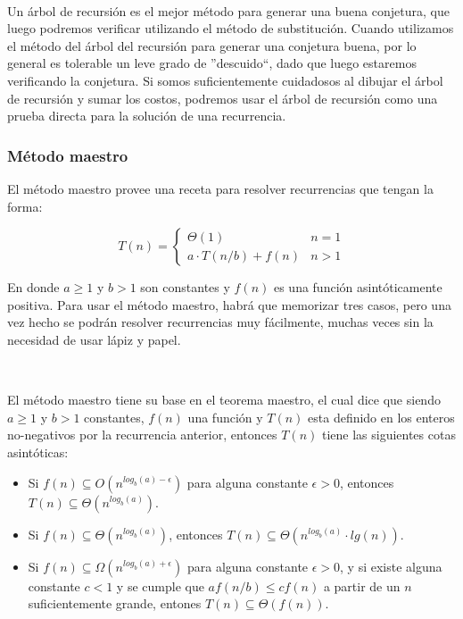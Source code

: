 ~

Un \'arbol de recursi\'on es el mejor m\'etodo para generar una buena conjetura, que luego podremos verificar utilizando el m\'etodo de substituci\'on. Cuando utilizamos el m\'etodo del \'arbol del recursi\'on para generar una conjetura buena, por lo general es tolerable un leve grado de ''descuido``, dado que luego estaremos verificando la conjetura. Si somos suficientemente cuidadosos al dibujar el \'arbol de recursi\'on y sumar los costos, podremos usar el \'arbol de recursi\'on como una prueba directa para la soluci\'on de una recurrencia.

\subsubsection{M\'etodo maestro}

El m\'etodo maestro provee una receta para resolver recurrencias que tengan la forma:

\begin{equation*}
  T(n) = \begin{cases}
	      \Theta(1)         		& n=1 \\
	      a \cdot T(n/b) + f(n)        	& n > 1
	  \end{cases}
\end{equation*}

En donde $a \geq 1$ y $b>1$ son constantes y $f(n)$ es una funci\'on asint\'oticamente positiva. Para usar el m\'etodo maestro, habr\'a que memorizar tres casos, pero una vez hecho se podr\'an resolver recurrencias muy f\'acilmente, muchas veces sin la necesidad de usar l\'apiz y papel.

~

El m\'etodo maestro tiene su base en el teorema maestro, el cual dice que siendo $a\geq 1$ y $b>1$ constantes, $f(n)$ una funci\'on y $T(n)$ esta definido en los enteros no-negativos por la recurrencia anterior, entonces $T(n)$ tiene las siguientes cotas asint\'oticas:

\begin{itemize}
 \item Si $f(n) \subseteq O(n^{log_b(a)-\epsilon})$ para alguna constante $\epsilon > 0$, entonces $T(n) \subseteq \Theta(n^{log_b(a)})$.
 \item Si $f(n) \subseteq \Theta(n^{log_b(a)})$, entonces $T(n) \subseteq \Theta(n^{log_b(a)} \cdot lg(n))$.
 \item Si $f(n) \subseteq \Omega(n^{log_b(a)+\epsilon})$ para alguna constante $\epsilon > 0$, y si existe alguna constante $c < 1$ y se cumple que $af(n/b) \leq cf(n)$ a partir de un $n$ suficientemente grande, entones $T(n) \subseteq \Theta(f(n))$.
\end{itemize}

